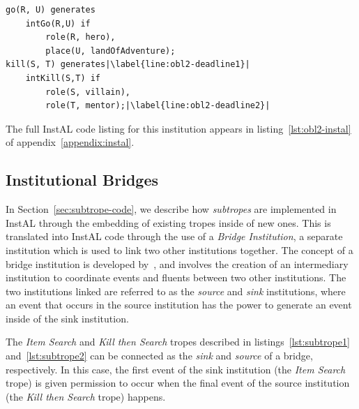 \documentclass[11pt]{report}
\begin{document}
\begin{lstlisting}[label={lst:obl2-gen}, caption={Generation events for the
trope in Listing~\ref{lst:obl2-trope}}, escapechar=|]
go(R, U) generates
    intGo(R,U) if
        role(R, hero),
        place(U, landOfAdventure);
kill(S, T) generates|\label{line:obl2-deadline1}|
    intKill(S,T) if
        role(S, villain),
        role(T, mentor);|\label{line:obl2-deadline2}|
\end{lstlisting}

The full InstAL code listing for this institution appears in
listing~\ref{lst:obl2-instal} of appendix~\ref{appendix:instal}.


\subsection{Institutional Bridges}

In Section~\ref{sec:subtrope-code}, we describe how \emph{subtropes} are
implemented in InstAL through the embedding of existing tropes inside of new
ones. This is translated into InstAL code through the use of a \emph{Bridge
  Institution}, a separate institution which is used to link two other
institutions together. The concept of a bridge institution is developed
by~\citet{bath45254}, and involves the creation of an intermediary institution to
coordinate events and fluents between two other institutions. The two institutions linked are referred to as the
\emph{source} and \emph{sink} institutions, where an event that occurs in the
source institution has the power to generate an event inside of the sink institution.

The \emph{Item Search} and \emph{Kill then Search} tropes
described in listings~\ref{lst:subtrope1} and~\ref{lst:subtrope2} can be
connected as the \emph{sink} and \emph{source} of a bridge,
respectively. In this case, the first event of the sink institution (the
\emph{Item Search} trope) is given permission to occur when the final event of
the source institution (the \emph{Kill then Search} trope) happens.
\end{document}
